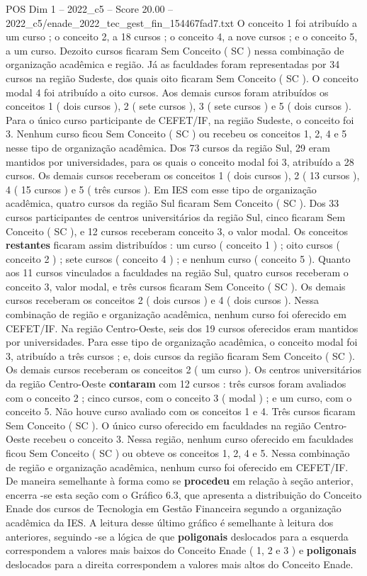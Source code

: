 \begin{textsample}{POS Dim 1 – 2022\_c5 – Score 20.00 – 2022\_c5/enade\_2022\_tec\_gest\_fin\_154467fad7.txt}
O conceito 1 foi atribuído a um curso ; o conceito 2, a 18 cursos ; o conceito 4, a nove cursos ; e o conceito 5, a um curso.
Dezoito cursos ficaram Sem Conceito ( SC ) nessa combinação de organização acadêmica e região.
Já as faculdades foram representadas por 34 cursos na região Sudeste, dos quais oito ficaram Sem Conceito ( SC ).
O conceito modal 4 foi atribuído a oito cursos.
Aos demais cursos foram atribuídos os conceitos 1 ( dois cursos ), 2 ( sete cursos ), 3 ( sete cursos ) e 5 ( dois cursos ).
Para o único curso participante de CEFET/IF, na região Sudeste, o conceito foi 3.
Nenhum curso ficou Sem Conceito ( SC ) ou recebeu os conceitos 1, 2, 4 e 5 nesse tipo de organização acadêmica.
Dos 73 cursos da região Sul, 29 eram mantidos por universidades, para os quais o conceito modal foi 3, atribuído a 28 cursos.
Os demais cursos receberam os conceitos 1 ( dois cursos ), 2 ( 13 cursos ), 4 ( 15 cursos ) e 5 ( três cursos ).
Em IES com esse tipo de organização acadêmica, quatro cursos da região Sul ficaram Sem Conceito ( SC ).
Dos 33 cursos participantes de centros universitários da região Sul, cinco ficaram Sem Conceito ( SC ), e 12 cursos receberam conceito 3, o valor modal.
Os conceitos \textbf{restantes} ficaram assim distribuídos : um curso ( conceito 1 ) ; oito cursos ( conceito 2 ) ; sete cursos ( conceito 4 ) ; e nenhum curso ( conceito 5 ).
Quanto aos 11 cursos vinculados a faculdades na região Sul, quatro cursos receberam o conceito 3, valor modal, e três cursos ficaram Sem Conceito ( SC ).
Os demais cursos receberam os conceitos 2 ( dois cursos ) e 4 ( dois cursos ).
Nessa combinação de região e organização acadêmica, nenhum curso foi oferecido em CEFET/IF.
Na região Centro-Oeste, seis dos 19 cursos oferecidos eram mantidos por universidades.
Para esse tipo de organização acadêmica, o conceito modal foi 3, atribuído a três cursos ; e, dois cursos da região ficaram Sem Conceito ( SC ).
Os demais cursos receberam os conceitos 2 ( um curso ).
Os centros universitários da região Centro-Oeste \textbf{contaram} com 12 cursos : três cursos foram avaliados com o conceito 2 ; cinco cursos, com o conceito 3 ( modal ) ; e um curso, com o conceito 5.
Não houve curso avaliado com os conceitos 1 e 4.
Três cursos ficaram Sem Conceito ( SC ).
O único curso oferecido em faculdades na região Centro-Oeste recebeu o conceito 3.
Nessa região, nenhum curso oferecido em faculdades ficou Sem Conceito ( SC ) ou obteve os conceitos 1, 2, 4 e 5.
Nessa combinação de região e organização acadêmica, nenhum curso foi oferecido em CEFET/IF.
De maneira semelhante à forma como se \textbf{procedeu} em relação à seção anterior, encerra -se esta seção com o Gráfico 6.3, que apresenta a distribuição do Conceito Enade dos cursos de Tecnologia em Gestão Financeira segundo a organização acadêmica da IES.
A leitura desse último gráfico é semelhante à leitura dos anteriores, seguindo -se a lógica de que \textbf{poligonais} deslocados para a esquerda correspondem a valores mais baixos do Conceito Enade ( 1, 2 e 3 ) e \textbf{poligonais} deslocados para a direita correspondem a valores mais altos do Conceito Enade.


\end{textsample}
